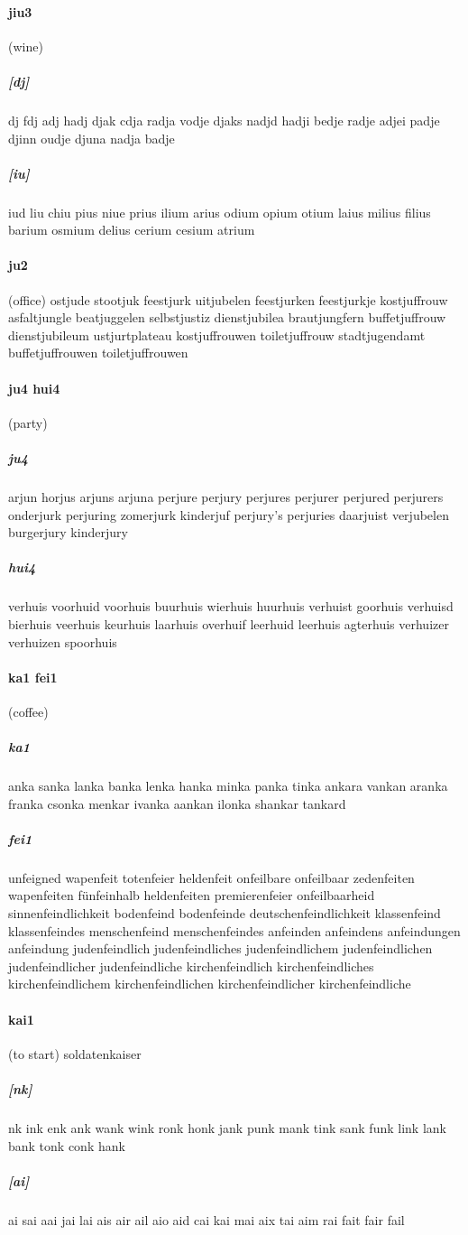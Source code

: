 \documentclass{article}
\begin{document}
\paragraph{jiu3}(wine) \subparagraph{[dj]}dj
fdj
adj
hadj
djak
cdja
radja
vodje
djaks
nadjd
hadji
bedje
radje
adjei
padje
djinn
oudje
djuna
nadja
badje
\subparagraph{[iu]}iud
liu
chiu
pius
niue
prius
ilium
arius
odium
opium
otium
laius
milius
filius
barium
osmium
delius
cerium
cesium
atrium
\paragraph{ju2}(office) ostjude
stootjuk
feestjurk
uitjubelen
feestjurken
feestjurkje
kostjuffrouw
asfaltjungle
beatjuggelen
selbstjustiz
dienstjubilea
brautjungfern
buffetjuffrouw
dienstjubileum
ustjurtplateau
kostjuffrouwen
toiletjuffrouw
stadtjugendamt
buffetjuffrouwen
toiletjuffrouwen
\paragraph{ju4 hui4}(party) \subparagraph{ju4}arjun
horjus
arjuns
arjuna
perjure
perjury
perjures
perjurer
perjured
perjurers
onderjurk
perjuring
zomerjurk
kinderjuf
perjury's
perjuries
daarjuist
verjubelen
burgerjury
kinderjury
\subparagraph{hui4}verhuis
voorhuid
voorhuis
buurhuis
wierhuis
huurhuis
verhuist
goorhuis
verhuisd
bierhuis
veerhuis
keurhuis
laarhuis
overhuif
leerhuid
leerhuis
agterhuis
verhuizer
verhuizen
spoorhuis
\paragraph{ka1 fei1}(coffee) \subparagraph{ka1}anka
sanka
lanka
banka
lenka
hanka
minka
panka
tinka
ankara
vankan
aranka
franka
csonka
menkar
ivanka
aankan
ilonka
shankar
tankard
\subparagraph{fei1}unfeigned
wapenfeit
totenfeier
heldenfeit
onfeilbare
onfeilbaar
zedenfeiten
wapenfeiten
fünfeinhalb
heldenfeiten
premierenfeier
onfeilbaarheid
sinnenfeindlichkeit
bodenfeind bodenfeinde
deutschenfeindlichkeit
klassenfeind klassenfeindes
menschenfeind menschenfeindes
anfeinden anfeindens anfeindungen anfeindung
judenfeindlich judenfeindliches judenfeindlichem judenfeindlichen judenfeindlicher judenfeindliche
kirchenfeindlich kirchenfeindliches kirchenfeindlichem kirchenfeindlichen kirchenfeindlicher kirchenfeindliche
\paragraph{kai1}(to start) soldatenkaiser
\subparagraph{[nk]}nk
ink
enk
ank
wank
wink
ronk
honk
jank
punk
mank
tink
sank
funk
link
lank
bank
tonk
conk
hank
\subparagraph{[ai]}ai
sai
aai
jai
lai
ais
air
ail
aio
aid
cai
kai
mai
aix
tai
aim
rai
fait
fair
fail
\end{document}
